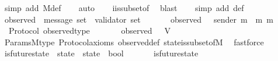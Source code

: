 \begin{isabellebody}
%
\isatagproof
{}\isamarkupfalse%
\ {\isacharparenleft}simp\ add{\isacharcolon}\ M{\isacharunderscore}def{\isacharparenright}\isanewline
\ \ \isamarkupfalse%
\ auto\isanewline
\ \ \isamarkupfalse%
\ {\isasymSigma}i{\isacharunderscore}is{\isacharunderscore}subset{\isacharunderscore}of{\isacharunderscore}{\isasymSigma}\ \isamarkupfalse%
\ blast\isanewline
\ \ \isamarkupfalse%
\ {\isacharparenleft}simp\ add{\isacharcolon}\ {\isasymSigma}{\isacharunderscore}def{\isacharparenright}%
\endisatagproof
{\isafoldproof}%
%
\isadelimproof
\ \isanewline
%
\endisadelimproof
\isanewline
\isanewline
{}\isamarkupfalse%
\ observed\ {\isacharcolon}{\isacharcolon}\ {\isachardoublequoteopen}message\ set\ {\isasymRightarrow}\ validator\ set{\isachardoublequoteclose}\isanewline
\ \ \isanewline
\ \ \ \ {\isachardoublequoteopen}observed\ {\isasymsigma}\ {\isacharequal}\ {\isacharbraceleft}sender\ m\ {\isacharbar}\ m{\isachardot}\ m\ {\isasymin}\ {\isasymsigma}{\isacharbraceright}{\isachardoublequoteclose}\isanewline
\isanewline
{}\isamarkupfalse%
\ {\isacharparenleft}\ Protocol{\isacharparenright}\ observed{\isacharunderscore}type\ {\isacharcolon}\isanewline
\ \ {\isachardoublequoteopen}{\isasymforall}\ {\isasymsigma}\ {\isasymin}\ {\isasymSigma}{\isachardot}\ observed\ {\isasymsigma}\ {\isasymsubseteq}\ V{\isachardoublequoteclose}\isanewline
%
\isadelimproof
\ \ %
\endisadelimproof
%
\isatagproof
{}\isamarkupfalse%
\ Params{\isachardot}M{\isacharunderscore}type\ Protocol{\isacharunderscore}axioms\ observed{\isacharunderscore}def\ state{\isacharunderscore}is{\isacharunderscore}subset{\isacharunderscore}of{\isacharunderscore}M\ \isamarkupfalse%
\ fastforce%
\endisatagproof
{\isafoldproof}%
%
\isadelimproof
\isanewline
%
\endisadelimproof
\isanewline
\isanewline
{}\isamarkupfalse%
\ is{\isacharunderscore}future{\isacharunderscore}state\ {\isacharcolon}{\isacharcolon}\ {\isachardoublequoteopen}{\isacharparenleft}state\ {\isacharasterisk}\ state{\isacharparenright}\ {\isasymRightarrow}\ bool{\isachardoublequoteclose}\isanewline
\ \ \isanewline
\ \ \ \ {\isachardoublequoteopen}is{\isacharunderscore}future{\isacharunderscore}state\ {\isacharparenleft}{\isasymsigma}{}{\isacharcomma}\ {\isasymsigma}{}{\isacharparenright}\ {\isacharequal}\ {\isacharparenleft}{\isasymsigma}{}\ {\isasymsubseteq}\ {\isasymsigma}{}{\isacharparenright}{\isachardoublequoteclose}\isanewline

\end{isabellebody}
